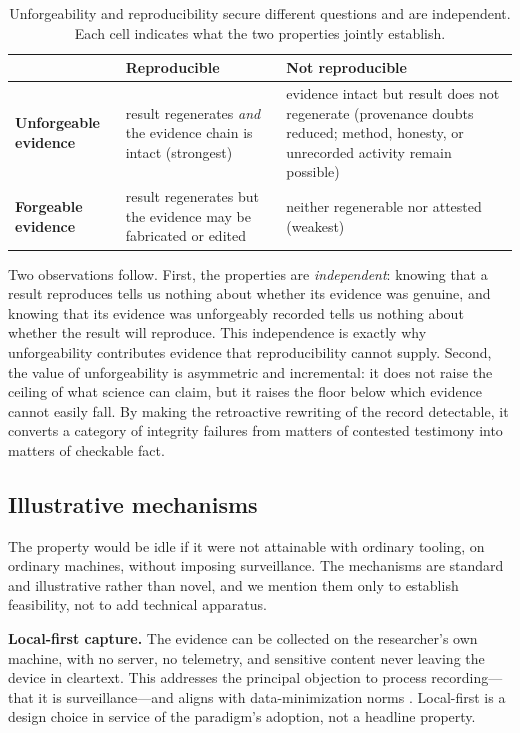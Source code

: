 \documentclass[11pt]{article}
\begin{document}
\begin{table}[ht]
\centering
\small
\begin{tabular}{@{}p{3.4cm}p{5.6cm}p{5.4cm}@{}}
\toprule
 & \textbf{Reproducible} & \textbf{Not reproducible} \\
\midrule
\textbf{Unforgeable evidence} &
result regenerates \emph{and} the evidence chain is intact (strongest) &
evidence intact but result does not regenerate (provenance doubts reduced; method, honesty, or unrecorded activity remain possible) \\
\textbf{Forgeable evidence} &
result regenerates but the evidence may be fabricated or edited &
neither regenerable nor attested (weakest) \\
\bottomrule
\end{tabular}
\caption{Unforgeability and reproducibility secure different questions and are
independent. Each cell indicates what the two properties jointly establish.}
\label{tab:comp}
\end{table}

Two observations follow. First, the properties are \emph{independent}: knowing that a
result reproduces tells us nothing about whether its evidence was genuine, and knowing
that its evidence was unforgeably recorded tells us nothing about whether the result
will reproduce. This independence is exactly why unforgeability contributes evidence
that reproducibility cannot supply. Second, the value of unforgeability is asymmetric
and incremental: it does not raise the ceiling of what science can claim, but it raises
the floor below which evidence cannot easily fall. By making the retroactive rewriting
of the record detectable, it converts a category of integrity failures from matters of
contested testimony into matters of checkable fact.

\subsection{Illustrative mechanisms}

The property would be idle if it were not attainable with ordinary tooling, on ordinary
machines, without imposing surveillance. The mechanisms are standard and illustrative
rather than novel, and we mention them only to establish feasibility, not to add
technical apparatus.

\textbf{Local-first capture.} The evidence can be collected on the researcher's own
machine, with no server, no telemetry, and sensitive content never leaving the device
in cleartext. This addresses the principal objection to process recording---that it is
surveillance---and aligns with data-minimization norms \parencite{voigt2017}. Local-first is
a design choice in service of the paradigm's adoption, not a headline property.
\end{document}
